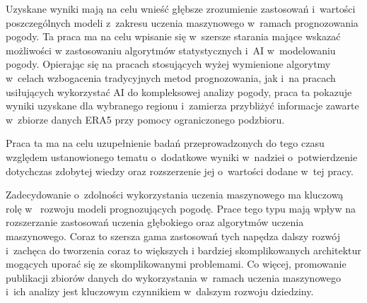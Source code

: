 Uzyskane wyniki mają na celu wnieść głębsze zrozumienie zastosowań i~wartości 
poszczególnych modeli z~zakresu uczenia maszynowego w~ramach prognozowania pogody.
Ta praca ma na celu wpisanie się w~szersze starania mające wskazać możliwości
w zastosowaniu algorytmów statystycznych i~AI w~modelowaniu pogody. Opierając
się na pracach stosujących wyżej wymienione algorytmy w~celach wzbogacenia
tradycyjnych metod prognozowania, jak i~na pracach usiłujących wykorzystać AI
do kompleksowej analizy pogody, praca ta pokazuje wyniki uzyskane dla wybranego
regionu i~zamierza przybliżyć informacje zawarte w~zbiorze danych ERA5 przy pomocy
ograniczonego podzbioru.

Praca ta ma na celu uzupełnienie badań przeprowadzonych do tego czasu względem 
ustanowionego tematu o~dodatkowe wyniki w~nadziei o~potwierdzenie dotychczas 
zdobytej wiedzy oraz rozszerzenie jej o~wartości dodane w~tej pracy.

Zadecydowanie o~zdolności wykorzystania uczenia maszynowego ma kluczową rolę w~
rozwoju modeli prognozujących pogodę. Prace tego typu mają wpływ na rozszerzanie
zastosowań uczenia głębokiego oraz algorytmów uczenia maszynowego. Coraz to szersza
gama zastosowań tych napędza dalszy rozwój i~zachęca do tworzenia coraz to większych
i bardziej skomplikowanych architektur mogących uporać się ze skomplikowanymi problemami.
Co więcej, promowanie publikacji zbiorów danych do wykorzystania w~ramach uczenia
maszynowego i~ich analizy jest kluczowym czynnikiem w~dalszym rozwoju dziedziny.

\pagebreak